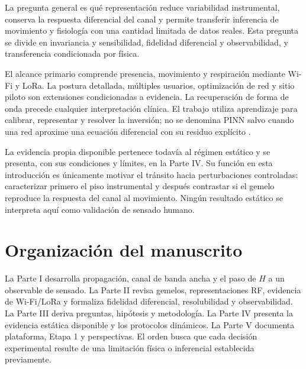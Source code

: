 La pregunta general es qué representación reduce variabilidad instrumental, conserva la respuesta diferencial del canal y permite transferir inferencia de movimiento y fisiología con una cantidad limitada de datos reales. Esta pregunta se divide en invariancia y sensibilidad, fidelidad diferencial y observabilidad, y transferencia condicionada por física.

El alcance primario comprende presencia, movimiento y respiración mediante Wi-Fi y LoRa. La postura detallada, múltiples usuarios, optimización de red y sitio piloto son extensiones condicionadas a evidencia. La recuperación de forma de onda precede cualquier interpretación clínica. El trabajo utiliza aprendizaje para calibrar, representar y resolver la inversión; no se denomina PINN salvo cuando una red aproxime una ecuación diferencial con su residuo explícito \citep{Raissi2019PINN}.

La evidencia propia disponible pertenece todavía al régimen estático y se presenta, con sus condiciones y límites, en la Parte IV. Su función en esta introducción es únicamente motivar el tránsito hacia perturbaciones controladas: caracterizar primero el piso instrumental y después contrastar si el gemelo reproduce la respuesta del canal al movimiento. Ningún resultado estático se interpreta aquí como validación de sensado humano.

\section{Organización del manuscrito}

La Parte I desarrolla propagación, canal de banda ancha y el paso de $H$ a un observable de sensado. La Parte II revisa gemelos, representaciones RF, evidencia de Wi-Fi/LoRa y formaliza fidelidad diferencial, resolubilidad y observabilidad. La Parte III deriva preguntas, hipótesis y metodología. La Parte IV presenta la evidencia estática disponible y los protocolos dinámicos. La Parte V documenta plataforma, Etapa 1 y perspectivas. El orden busca que cada decisión experimental resulte de una limitación física o inferencial establecida previamente.
